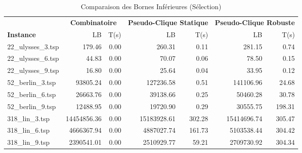 \begin{table}[H]
\centering
\caption{Comparaison des Bornes Inférieures (Sélection)}
\small
\begin{tabular}{|l||r|r||r|r||r|r|}
\hline
 & \multicolumn{2}{c||}{\textbf{Combinatoire}} & \multicolumn{2}{c||}{\textbf{Pseudo-Clique Statique}} & \multicolumn{2}{c|}{\textbf{Pseudo-Clique Robuste}} \\
\cline{2-7}
\textbf{Instance} & LB & T(s) & LB & T(s) & LB & T(s) \\
\hline
22\_ulysses\_3.tsp & 179.46 & 0.00 & 260.31 & 0.11 & 281.15 & 0.74 \\
22\_ulysses\_6.tsp & 44.83 & 0.00 & 70.07 & 0.06 & 78.50 & 0.15 \\
22\_ulysses\_9.tsp & 16.80 & 0.00 & 25.64 & 0.04 & 33.95 & 0.12 \\
52\_berlin\_3.tsp & 93805.24 & 0.00 & 127236.58 & 0.51 & 141106.96 & 24.68 \\
52\_berlin\_6.tsp & 26663.76 & 0.00 & 39138.66 & 0.25 & 50460.28 & 30.78 \\
52\_berlin\_9.tsp & 12488.95 & 0.00 & 19720.90 & 0.29 & 30555.75 & 198.31 \\
318\_lin\_3.tsp & 14454856.36 & 0.00 & 15183928.61 & 302.28 & 15414696.74 & 305.47 \\
318\_lin\_6.tsp & 4666367.94 & 0.00 & 4887027.74 & 161.73 & 5103538.44 & 304.42 \\
318\_lin\_9.tsp & 2390541.01 & 0.00 & 2510929.77 & 59.21 & 2709730.92 & 304.34 \\
\hline
\end{tabular}
\end{table}
